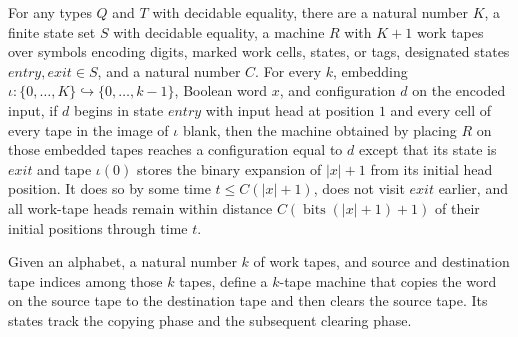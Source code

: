 \begin{theorem}
\label{Turing.rt_exists_cleanDigitBoundTM}
\leanok
{}
For any types $Q$ and $T$ with decidable equality, there are a natural number $K$, a
finite state set $S$ with decidable equality, a machine $R$ with $K+1$ work tapes over
symbols encoding digits, marked work cells, states, or tags, designated states
$entry,exit\in S$, and a natural number $C$. For every $k$, embedding
$\iota:\{0,\ldots,K\}\hookrightarrow\{0,\ldots,k-1\}$, Boolean word $x$, and
configuration $d$ on the encoded input, if $d$ begins in state $entry$ with input head
at position $1$ and every cell of every tape in the image of $\iota$ blank, then the
machine obtained by placing $R$ on those embedded tapes reaches a configuration equal to
$d$ except that its state is $exit$ and tape $\iota(0)$ stores the binary expansion of
$|x|+1$ from its initial head position. It does so by some time $t\le C(|x|+1)$, does
not visit $exit$ earlier, and all work-tape heads remain within distance
$C(\operatorname{bits}(|x|+1)+1)$ of their initial positions through time $t$.
\end{theorem}

\begin{definition}
\label{Turing.rt_moveWordTM}
\leanok
{}
Given an alphabet, a natural number $k$ of work tapes, and source and destination tape
indices among those $k$ tapes, define a $k$-tape machine that copies the word on the
source tape to the destination tape and then clears the source tape. Its states track
the copying phase and the subsequent clearing phase.
\end{definition}


